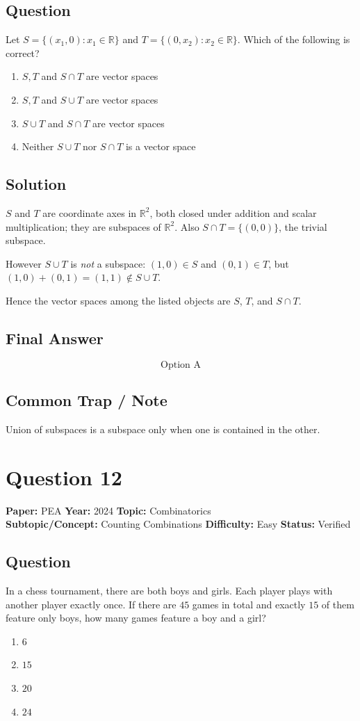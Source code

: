 \documentclass[11pt]{article}
\begin{document}
\subsection*{Question}
Let $S=\{(x_1,0):x_1\in\mathbb{R}\}$ and $T=\{(0,x_2):x_2\in\mathbb{R}\}$. Which of the following is correct?
\begin{enumerate}[label=(\Alph*)]
\item $S,T$ and $S\cap T$ are vector spaces
\item $S,T$ and $S\cup T$ are vector spaces
\item $S\cup T$ and $S\cap T$ are vector spaces
\item Neither $S\cup T$ nor $S\cap T$ is a vector space
\end{enumerate}

\subsection*{Solution}
$S$ and $T$ are coordinate axes in $\mathbb{R}^{2}$, both closed under addition and scalar multiplication; they are subspaces of $\mathbb{R}^{2}$. Also $S\cap T=\{(0,0)\}$, the trivial subspace.

However $S\cup T$ is \emph{not} a subspace: $(1,0)\in S$ and $(0,1)\in T$, but $(1,0)+(0,1)=(1,1)\notin S\cup T$.

Hence the vector spaces among the listed objects are $S$, $T$, and $S\cap T$.

\subsection*{Final Answer}
\[
\boxed{\text{Option A}}
\]

\subsection*{Common Trap / Note}
Union of subspaces is a subspace only when one is contained in the other.

\section*{Question 12}
\textbf{Paper:} PEA \quad \textbf{Year:} 2024 \quad \textbf{Topic:} Combinatorics \\
\textbf{Subtopic/Concept:} Counting Combinations \quad \textbf{Difficulty:} Easy \quad \textbf{Status:} Verified

\subsection*{Question}
In a chess tournament, there are both boys and girls. Each player plays with another player exactly once. If there are $45$ games in total and exactly $15$ of them feature only boys, how many games feature a boy and a girl?
\begin{enumerate}[label=(\Alph*)]
\item $6$
\item $15$
\item $20$
\item $24$
\end{enumerate}
\end{document}
